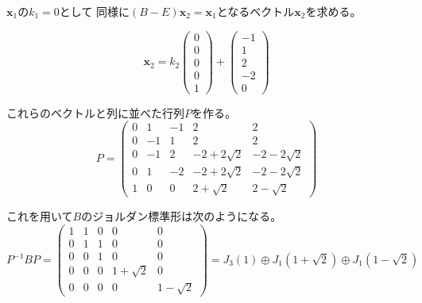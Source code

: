 \documentclass[12pt,b5paper]{ltjsarticle}
\begin{document}
$\bm{x}_1$の$k_1=0$として
同様に$(B-E)\bm{x}_2=\bm{x}_1$となるベクトル$\bm{x}_2$を求める。

\begin{equation}
 \bm{x}_2
       = k_2\begin{pmatrix} 0\\0\\0\\0\\1 \end{pmatrix}
       + \begin{pmatrix} -1\\1\\2\\-2\\0 \end{pmatrix}
\end{equation}

これらのベクトルと列に並べた行列$P$を作る。
\begin{equation}
 P=
  \begin{pmatrix}
   0 & 1 & -1 & 2 & 2 \\
   0 & -1 & 1 & 2 & 2 \\
   0 & -1 & 2 & -2+2\sqrt{2} & -2-2\sqrt{2} \\
   0 & 1 & -2 & -2+2\sqrt{2} & -2-2\sqrt{2} \\
   1 & 0 & 0 & 2+\sqrt{2} & 2-\sqrt{2}
  \end{pmatrix}
\end{equation}

これを用いて$B$のジョルダン標準形は次のようになる。
\begin{equation}
 P^{-1}BP=
  \begin{pmatrix}
   1 & 1 & 0 & 0 & 0 \\
   0 & 1 & 1 & 0 & 0 \\
   0 & 0 & 1 & 0 & 0 \\
   0 & 0 & 0 & 1+\sqrt{2} & 0 \\
   0 & 0 & 0 & 0 & 1-\sqrt{2}
  \end{pmatrix}
  =J_3(1) \oplus J_1(1+\sqrt{2}) \oplus J_1(1-\sqrt{2})
\end{equation}
\end{document}
